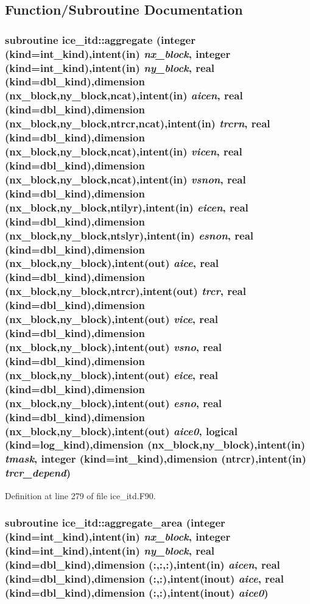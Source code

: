 \subsection{Function/Subroutine Documentation}
\hypertarget{namespaceice__itd_a8360ff94dd398d403890bfe9e8030b51}{
\subsubsection[{aggregate}]{\setlength{\rightskip}{0pt plus 5cm}subroutine ice\_\-itd::aggregate (integer (kind=int\_\-kind),intent(in) {\em nx\_\-block}, \/  integer (kind=int\_\-kind),intent(in) {\em ny\_\-block}, \/  real (kind=dbl\_\-kind),dimension (nx\_\-block,ny\_\-block,ncat),intent(in) {\em aicen}, \/  real (kind=dbl\_\-kind),dimension (nx\_\-block,ny\_\-block,ntrcr,ncat),intent(in) {\em trcrn}, \/  real (kind=dbl\_\-kind),dimension (nx\_\-block,ny\_\-block,ncat),intent(in) {\em vicen}, \/  real (kind=dbl\_\-kind),dimension (nx\_\-block,ny\_\-block,ncat),intent(in) {\em vsnon}, \/  real (kind=dbl\_\-kind),dimension (nx\_\-block,ny\_\-block,ntilyr),intent(in) {\em eicen}, \/  real (kind=dbl\_\-kind),dimension (nx\_\-block,ny\_\-block,ntslyr),intent(in) {\em esnon}, \/  real (kind=dbl\_\-kind),dimension (nx\_\-block,ny\_\-block),intent(out) {\em aice}, \/  real (kind=dbl\_\-kind),dimension (nx\_\-block,ny\_\-block,ntrcr),intent(out) {\em trcr}, \/  real (kind=dbl\_\-kind),dimension (nx\_\-block,ny\_\-block),intent(out) {\em vice}, \/  real (kind=dbl\_\-kind),dimension (nx\_\-block,ny\_\-block),intent(out) {\em vsno}, \/  real (kind=dbl\_\-kind),dimension (nx\_\-block,ny\_\-block),intent(out) {\em eice}, \/  real (kind=dbl\_\-kind),dimension (nx\_\-block,ny\_\-block),intent(out) {\em esno}, \/  real (kind=dbl\_\-kind),dimension (nx\_\-block,ny\_\-block),intent(out) {\em aice0}, \/  logical (kind=log\_\-kind),dimension (nx\_\-block,ny\_\-block),intent(in) {\em tmask}, \/  integer (kind=int\_\-kind),dimension (ntrcr),intent(in) {\em trcr\_\-depend})}}
\label{namespaceice__itd_a8360ff94dd398d403890bfe9e8030b51}


Definition at line 279 of file ice\_\-itd.F90.\hypertarget{namespaceice__itd_a428ffa5cfc4adb00cd323a2d76bf1c4d}{
\subsubsection[{aggregate\_\-area}]{\setlength{\rightskip}{0pt plus 5cm}subroutine ice\_\-itd::aggregate\_\-area (integer (kind=int\_\-kind),intent(in) {\em nx\_\-block}, \/  integer (kind=int\_\-kind),intent(in) {\em ny\_\-block}, \/  real (kind=dbl\_\-kind),dimension (:,:,:),intent(in) {\em aicen}, \/  real (kind=dbl\_\-kind),dimension (:,:),intent(inout) {\em aice}, \/  real (kind=dbl\_\-kind),dimension (:,:),intent(inout) {\em aice0})}}
\label{namespaceice__itd_a428ffa5cfc4adb00cd323a2d76bf1c4d}


